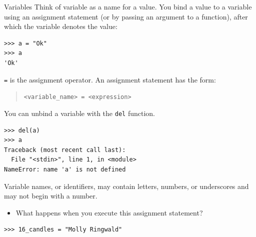 \documentclass[smaller, aspectratio=1610]{beamer}
\begin{document}
\begin{frame}[label={sec:org4fd7bbf},fragile]{Variables}
 Think of variable as a name for a value. You bind a value to a variable using an assignment statement (or by passing an argument to a function), after which the variable \alert{denotes} the value:

\lstset{language=Python,label= ,caption= ,captionpos=b,numbers=none}
\begin{lstlisting}
>>> a = "Ok"
>>> a
'Ok'
\end{lstlisting}

\texttt{=} is the assignment operator.  An assignment statement has the form:

\begin{quote}
\texttt{<variable\_name> = <expression>}
\end{quote}

You can unbind a variable with the \texttt{del} function.

\lstset{language=Python,label= ,caption= ,captionpos=b,numbers=none}
\begin{lstlisting}
>>> del(a)
>>> a
Traceback (most recent call last):
  File "<stdin>", line 1, in <module>
NameError: name 'a' is not defined
\end{lstlisting}

Variable names, or identifiers, may contain letters, numbers, or underscores and may not begin with a number.

\begin{itemize}
\item What happens when you execute this assignment statement?
\end{itemize}

\lstset{language=Python,label= ,caption= ,captionpos=b,numbers=none}
\begin{lstlisting}
>>> 16_candles = "Molly Ringwald"
\end{lstlisting}
\end{frame}
\end{document}
